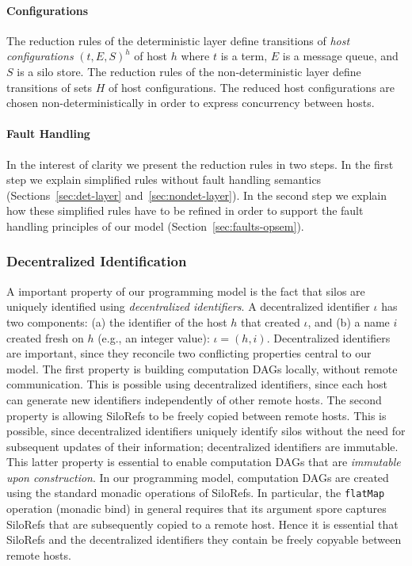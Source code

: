 \documentclass[10pt]{sigplanconf}
\theoremstyle{definition}
\theoremstyle{definition}
\begin{document}
\paragraph{Configurations}

The reduction rules of the deterministic layer define transitions of \emph{host
configurations} $(t, E, S)^h$ of host $h$ where $t$ is a term, $E$ is a message
queue, and $S$ is a silo store. The reduction rules of the non-deterministic
layer define transitions of sets $H$ of host configurations. The reduced host
configurations are chosen non-deterministically in order to express concurrency
between hosts.

\paragraph{Fault Handling}

In the interest of clarity we present the reduction rules in two steps. In the
first step we explain simplified rules without fault handling semantics
(Sections~\ref{sec:det-layer} and~\ref{sec:nondet-layer}). In the second step
we explain how these simplified rules have to be refined in order to support
the fault handling principles of our model (Section~\ref{sec:faults-opsem}).

\subsubsection{Decentralized Identification}

A important property of our programming model is the fact that silos are
uniquely identified using \emph{decentralized identifiers}. A decentralized
identifier $\iota$ has two components: (a) the identifier of the host $h$ that
created $\iota$, and (b) a name $i$ created fresh on $h$ (e.g., an integer
value): $\iota = (h, i)$. Decentralized identifiers are important, since they
reconcile two conflicting properties central to our model. The first property
is building computation DAGs locally, without remote communication. This is
possible using decentralized identifiers, since each host can generate new
identifiers independently of other remote hosts. The second property is
allowing SiloRefs to be freely copied between remote hosts. This is possible,
since decentralized identifiers uniquely identify silos without the need for
subsequent updates of their information; decentralized identifiers are
immutable. This latter property is essential to enable computation DAGs that
are \emph{immutable upon construction}. In our programming model, computation
DAGs are created using the standard monadic operations of SiloRefs. In
particular, the \texttt{flatMap} operation (monadic bind) in general requires
that its argument spore captures SiloRefs that are subsequently copied to a
remote host. Hence it is essential that SiloRefs and the decentralized
identifiers they contain be freely copyable between remote hosts.
\end{document}
